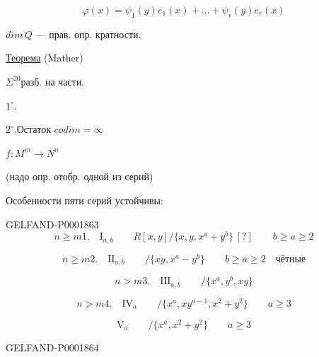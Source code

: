 \begin{equation*}\varphi(x)=\psi_1(y)e_1(x)+\ldots+\psi_r(y)e_r(x)\end{equation*}

$dim\,Q$ — прав. опр. кратности.

\underline{Теорема} (Mather)

$\Sigma^{20}$\quad разб. на части.

$1^\circ.$\quad{}

$2^\circ.$\quad Остаток $codim=\infty$

$f:M^m\longrightarrow N^n$

(надо опр. отобр. одной из серий)

Особенности пяти серий устойчивы:

\begin{GelfandAdjacentEvidence}{GELFAND-P000186}{3}
\begin{equation*}n\geq m1.\quad\mathrm{I}_{a,b}\qquad R[x,y]/\{x,y,x^a+y^b\}\,[?]\qquad b\geq a\geq2\end{equation*}
\end{GelfandAdjacentEvidence}

\begin{equation*}n\geq m2.\quad\mathrm{II}_{a,b}\qquad/\{xy,x^a-y^b\}\qquad b\geq a\geq2\quad\text{чётные}\end{equation*}

\begin{equation*}n>m3.\quad\mathrm{III}_{a,b}\qquad/\{x^a,y^b,xy\}\end{equation*}

\begin{equation*}n>m4.\quad\mathrm{IV}_a\qquad/\{x^a,xy^{a-1},x^2+y^2\}\qquad a\geq3\end{equation*}

\begin{equation*}\mathrm{V}_a\qquad/\{x^a,x^2+y^2\}\qquad a\geq3\end{equation*}

\begin{GelfandAdjacentEvidence}{GELFAND-P000186}{4}
\end{GelfandAdjacentEvidence}

